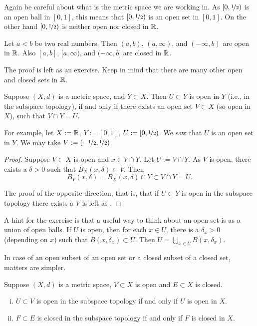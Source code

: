 Again be careful about what is the metric space we are working in.
As $[0,\nicefrac{1}{2})$ is
an open ball in $[0,1]$, this means that $[0,\nicefrac{1}{2})$ is
an open set in $[0,1]$.  On the other hand $[0,\nicefrac{1}{2})$
is neither open nor closed in ${\mathbb{R}}$.

\begin{prop} \label{prop:topology:intervals:openclosed}
Let $a < b$ be two real numbers.  Then $(a,b)$, $(a,\infty)$,
and $(-\infty,b)$ are open in ${\mathbb{R}}$.
Also $[a,b]$, $[a,\infty)$,
and $(-\infty,b]$ are closed in ${\mathbb{R}}$.
\end{prop}

The proof is left as an exercise.  Keep in mind that
there are many other open and
closed sets in ${\mathbb{R}}$.

\begin{prop} \label{prop:topology:subspaceopen}
Suppose $(X,d)$ is a metric space, and $Y \subset X$.  Then $U \subset Y$
is open in $Y$ (i.e., in the subspace topology), if and only if
there exists an open set $V \subset X$ (so open in $X$), such that
$V \cap Y = U$.
\end{prop}

For example, let $X := {\mathbb{R}}$, $Y:=[0,1]$, $U := [0,\nicefrac{1}{2})$.
We saw that $U$ is an open set in $Y$.
We may take $V := (-\nicefrac{1}{2},\nicefrac{1}{2})$.

\begin{proof}
Suppose $V \subset X$ is open and $x \in V \cap Y$.
Let $U := V \cap Y$.
As $V$ is open, there
exists a $\delta > 0$ such that $B_X(x,\delta) \subset V$.
Then
\begin{equation*}
B_Y(x,\delta) = B_X(x,\delta) \cap Y \subset V \cap Y = U .
\end{equation*}

The proof of the opposite direction, that is, that if $U \subset Y$
is open in the subspace topology there exists a $V$ is left as
.
\end{proof}

A hint for the exercise is that
a useful way to think about an open set is as a union of open balls.  If $U$ is
open, then for each $x \in U$, there is a $\delta_x > 0$ (depending on $x$) such that
$B(x,\delta_x) \subset U$.  Then $U = \bigcup_{x\in U} B(x,\delta_x)$.

In case of an open subset of an open set or a closed subset of a closed
set, matters are simpler.

\begin{prop} \label{prop:topology:subspacesame}
Suppose $(X,d)$ is a metric space, $V \subset X$ is open
and $E \subset X$ is closed.
\begin{enumerate}[(i)]
\item \label{prop:topology:subspacesame:i}
$U \subset V$ is open in the subspace topology if and only if $U$ is open
in $X$.
\item \label{prop:topology:subspacesame:ii}
$F \subset E$ is closed in the subspace topology if and only if $F$ is
closed in $X$.
\end{enumerate}
\end{prop}

